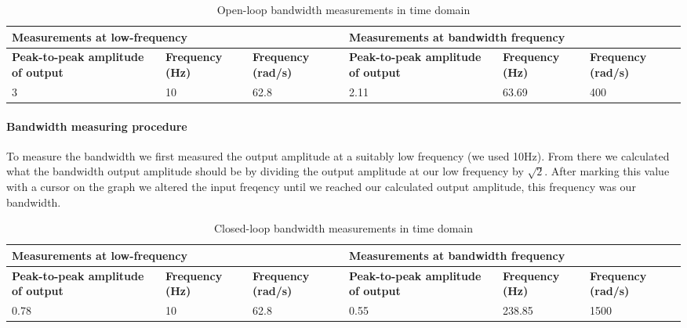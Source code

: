 \documentclass[12pt]{article}
\begin{document}

\begin{table}[ht]
\centering
    \begin{tabular}{|p{2cm}|p{2cm}|p{2cm}|p{2cm}|p{2cm}|p{2cm}|}
        \hline
        \multicolumn{3}{|p{6cm}|}{Measurements at low-frequency} & \multicolumn{3}{|p{6cm}|}{Measurements at bandwidth frequency}\\
        \hline
        \textbf{Peak-to-peak amplitude of output} & \textbf{Frequency (Hz)} & \textbf{Frequency (rad/s)} & \textbf{Peak-to-peak amplitude of output} & \textbf{Frequency (Hz)} & \textbf{Frequency (rad/s)}\\
        \hline
        3  & 10 & 62.8  &  2.11  &  63.69 &  400\\
        \hline
    \end{tabular}
    \caption{Open-loop bandwidth measurements in time domain}
    \label{tab:open-loop}
\end{table}

\paragraph{Bandwidth measuring procedure} %
\label{par:bandwidth_measuring_procedure}
To measure the bandwidth we first measured the output amplitude at a suitably low frequency (we used 10Hz). From there we calculated what the bandwidth output amplitude should be by dividing the output amplitude at our low frequency by $\sqrt{2}$. After marking this value with a cursor on the graph we altered the input freqency until we reached our calculated output amplitude, this frequency was our bandwidth.


\begin{table}[ht]
\centering
    \begin{tabular}{|p{2cm}|p{2cm}|p{2cm}|p{2cm}|p{2cm}|p{2cm}|}
        \hline
        \multicolumn{3}{|p{6cm}|}{Measurements at low-frequency} & \multicolumn{3}{|p{6cm}|}{Measurements at bandwidth frequency}\\
        \hline
        \textbf{Peak-to-peak amplitude of output} & \textbf{Frequency (Hz)} & \textbf{Frequency (rad/s)} & \textbf{Peak-to-peak amplitude of output} & \textbf{Frequency (Hz)} & \textbf{Frequency (rad/s)}\\
        \hline
        0.78   & 10&  62.8 &   0.55   & 238.85 & 1500\\
        \hline
    \end{tabular}
    \caption{Closed-loop bandwidth measurements in time domain}
    \label{tab:closed-loop}
\end{table}
\end{document}
